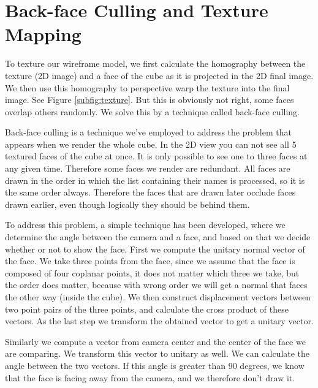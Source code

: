 \section{Back-face Culling and Texture Mapping}

To texture our wireframe model, we first calculate the homography between the texture (2D image) and a face of the cube as it is projected in the 2D final image. We then use this homography to perspective warp the texture into the final image. See Figure \ref{subfig:texture}. But this is obviously not right, some faces overlap others randomly. We solve this by a technique called back-face culling.

Back-face culling is a technique we've employed to address the problem that appears when we render the whole cube. In the 2D view you can not see all 5 textured faces of the cube at once. It is only possible to see one to three faces at any given time. Therefore some faces we render are redundant. All faces are drawn in the order in which the list containing their names is processed, so it is the same order always. Therefore the faces that are drawn later occlude faces drawn earlier, even though logically they should be behind them. 

To address this problem, a simple technique has been developed, where we determine the angle between the camera and a face, and based on that we decide whether or not to show the face. First we compute the unitary normal vector of the face. We take three points from the face, since we assume that the face is composed of four coplanar points, it does not matter which three we take, but the order does matter, because with wrong order we will get a normal that faces the other way (inside the cube). We then construct displacement vectors between two point pairs of the three points, and calculate the cross product of these vectors. As the last step we transform the obtained vector to get a unitary vector. 

Similarly we compute a vector from camera center and the center of the face we are comparing. We transform this vector to unitary as well. We can calculate the angle between the two vectors. If this angle is greater than 90 degrees, we know that the face is facing away from the camera, and we therefore don't draw it.

